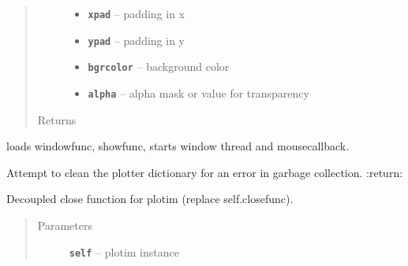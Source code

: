 \documentclass[letterpaper,10pt,english]{sphinxmanual}
\begin{document}
\begin{fulllineitems}
\begin{fulllineitems}
\begin{quote}
\begin{description}
\begin{itemize}
\begin{itemize}
\end{itemize}


\item {} 
\textbf{\texttt{xpad}} -- padding in x

\item {} 
\textbf{\texttt{ypad}} -- padding in y

\item {} 
\textbf{\texttt{bgrcolor}} -- background color

\item {} 
\textbf{\texttt{alpha}} -- alpha mask or value for transparency

\end{itemize}

\item[{Returns}] \leavevmode


\end{description}\end{quote}

\end{fulllineitems}


\begin{fulllineitems}
\label{RRtoolbox.lib:RRtoolbox.lib.plotter.plotim.builtinwindow}
loads windowfunc, showfunc, starts window thread and mousecallback.

\end{fulllineitems}


\begin{fulllineitems}
\label{RRtoolbox.lib:RRtoolbox.lib.plotter.plotim.clean}
Attempt to clean the plotter dictionary for an error in
garbage collection.
:return:

\end{fulllineitems}


\begin{fulllineitems}
\label{RRtoolbox.lib:RRtoolbox.lib.plotter.plotim.closefunc}
Decoupled close function for plotim (replace self.closefunc).
\begin{quote}\begin{description}
\item[{Parameters}] \leavevmode
\textbf{\texttt{self}} -- plotim instance


\end{description}
\end{quote}
\end{fulllineitems}
\end{fulllineitems}
\end{document}
